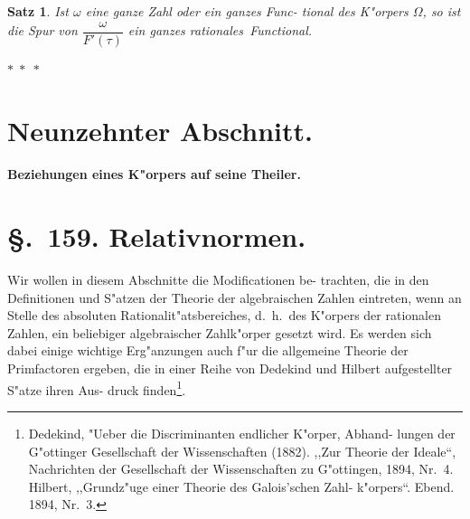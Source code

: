 \documentclass[12pt,a4paper]{article}
\theoremstyle{weber}
\newtheorem*{satz}{Satz}
\begin{document}
\begin{satz}
Ist $\omega$ eine ganze Zahl oder ein ganzes Func-
tional des K"orpers $\varOmega$, so ist die Spur von $\dfrac{\omega}{F'(\tau)}$
ein ganzes rationales~Functional.
\end{satz}

\bigskip\bigskip
\centerline{$*\;*\;*$}
\bigskip\bigskip

\section*{Neunzehnter Abschnitt.}

\begin{center}
\Large\bfseries
Beziehungen eines K"orpers auf seine Theiler.
\end{center}
\bigskip

\section*{\S.~159. Relativnormen.}

Wir wollen in diesem Abschnitte die Modificationen be-
trachten, die in den Definitionen und S"atzen der Theorie der
algebraischen Zahlen eintreten, wenn an Stelle des absoluten
Rationalit"atsbereiches, d.~h.\ des K"orpers der rationalen
Zahlen, ein beliebiger algebraischer Zahlk"orper gesetzt wird. Es
werden sich dabei einige wichtige Erg"anzungen auch f"ur die
allgemeine Theorie der Primfactoren ergeben, die in einer Reihe
von Dedekind und Hilbert aufgestellter S"atze ihren Aus-
druck finden\footnote{Dedekind, "Ueber die Discriminanten endlicher K"orper, Abhand-
lungen der G"ottinger Gesellschaft der Wissenschaften (1882). ,,Zur Theorie
der Ideale``, Nachrichten der Gesellschaft der Wissenschaften zu G"ottingen,
1894, Nr.~4. Hilbert, ,,Grundz"uge einer Theorie des Galois'schen Zahl-
k"orpers``. Ebend. 1894, Nr.~3.}.
\end{document}

